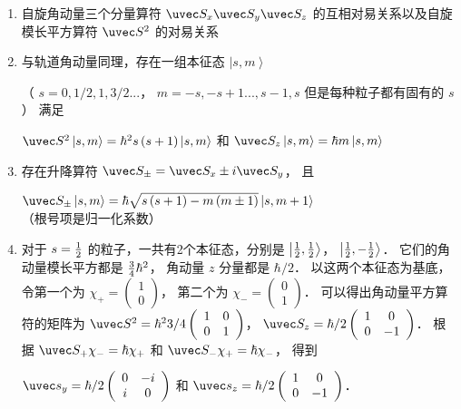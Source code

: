 
\begin{enumerate}
\item 自旋角动量三个分量算符 ${\uvec S_x}{\uvec S_y}{\uvec S_z}$ 的互相对易关系以及自旋模长平方算符 ${\uvec S^2}$ 的对易关系 %
\item 与轨道角动量同理，存在一组本征态 $\left| {s,m} \right\rangle $ 

（ $s = 0,{1}/{2},1,{3}/{2}...$， $m =  - s, - s + 1...,s - 1,s$ 但是每种粒子都有固有的 $s$ ） 满足

 ${\uvec S^2}\left| {s,m} \right\rangle  = {\hbar ^2}s\left( {s + 1} \right)\left| {s,m} \right\rangle $ 和 ${\uvec S_z}\left| {s,m} \right\rangle  = \hbar m\left| {s,m} \right\rangle $
\item 存在升降算符 ${\uvec S_ \pm } = {\uvec S_x} \pm i{\uvec S_y}$， 且

 ${\uvec S_ \pm }\left| {s,m} \right\rangle  = \hbar \sqrt {s\left( {s + 1} \right) - m\left( {m \pm 1} \right)} \left| {s,m + 1} \right\rangle $ （根号项是归一化系数）
\item 对于 $s = {\textstyle{1 \over 2}}$ 的粒子，一共有2个本征态，分别是 $\left| {{\textstyle{1 \over 2}},{\textstyle{1 \over 2}}} \right\rangle $，  $\left| {{\textstyle{1 \over 2}}, - {\textstyle{1 \over 2}}} \right\rangle $． 它们的角动量模长平方都是 ${\textstyle{3 \over 4}}{\hbar ^2}$， 角动量 $z$ 分量都是 ${\hbar }/{2}$．  以这两个本征态为基底，令第一个为  ${\chi_ + } = \left( {\begin{array}{*{20}{c}}
1\\
0
\end{array}} \right)$， 第二个为 ${\chi_ - } = \left( \begin{array}{l}
0\\
1
\end{array} \right)$． 可以得出角动量平方算符的矩阵为 ${\uvec S^2} = {\hbar ^2}{3}/{4}\left( {\begin{array}{*{20}{c}}
1&0\\
0&1
\end{array}} \right)$，   ${\uvec S_z} = {\hbar }/{2}\left( {\begin{array}{*{20}{c}}
1&0\\
0&{ - 1}
\end{array}} \right)$． 根据 ${\uvec S_ + }{\chi_ - } = \hbar {\chi_ + }$ 和 ${\uvec S_ - }{\chi_ + } = \hbar {\chi_ - }$，   得到

 ${\uvec s_y} = {\hbar }/{2}\left( {\begin{array}{*{20}{c}}
0&{ - i}\\
i&0
\end{array}} \right)$ 和 ${\uvec s_z} = {\hbar }/{2}\left( {\begin{array}{*{20}{c}}
1&0\\
0&{ - 1}
\end{array}} \right)$． 


\end{enumerate}
